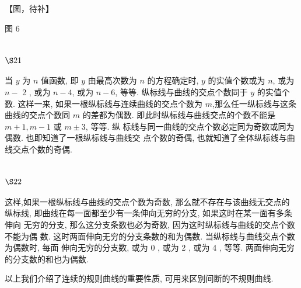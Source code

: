 【图，待补】

图 6

\section{$\S 21$}

当 $y$ 为 $n$ 值函数, 即 $y$ 由最高次数为 $n$ 的方程确定时, $y$ 的实值个数或为 $n$, 或为 $n-$ 2 , 或为 $n-4$, 或为 $n-6$, 等等. 纵标线与曲线的交点个数同于 $y$ 的实值个数. 这样一来, 如果一根纵标线与连续曲线的交点个数为 $m$,那么任一纵标线与这条曲线的交点个数同 $m$ 的差都为偶数. 即此时纵标线与曲线交点的个数不能是 $m+1, m-1$ 或 $m \pm 3$, 等等. 纵 标线与同一曲线的交点个数必定同为奇数或同为偶数. 也即知道了一根纵标线与曲线交 点个数的奇偶, 也就知道了全体纵标线与曲线交点个数的奇偶.

\section{$\S 22$}

这样,如果一根纵标线与曲线的交点个数为奇数, 那么就不存在与该曲线无交点的 纵标线, 即曲线在每一面都至少有一条伸向无穷的分支, 如果这时在某一面有多条伸向 无穷的分支, 那么这分支条数也必为奇数, 因为这时纵标线与曲线的交点个数不能为偶 数. 这时两面伸向无穷的分支条数的和为偶数. 当纵标线与曲线交点个数为偶数时, 每面 伸向无穷的分支数, 或为 0 , 或为 2 , 或为 4 , 等等. 两面伸向无穷的分支数的和也为偶数.

以上我们介绍了连续的规则曲线的重要性质, 可用来区别间断的不规则曲线. 

